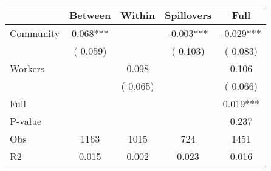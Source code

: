 
\begin{tabular}{l*{4}{c}}\hline&\multicolumn{1}{c}{Between}&\multicolumn{1}{c}{Within}&\multicolumn{1}{c}{Spillovers}&\multicolumn{1}{c}{Full}\\ \hline
 Community             &              0.068***      &                                               &       -0.003*** &        -0.029***                            \\ 
                               &        (       0.059)           &                                       &       (       0.103)     &      (       0.083)                                           \\ 
 Workers       &                                               &        0.098    &                                &             0.106                            \\ 
                               &                                               & (       0.065)                  &                                        &      (       0.066)                                           \\ 
\hline                                                                                                                                                                                                                                            
 Full                  &                                               &                                               &                                        &             0.019***                                     \\ 
 P-value               &                                               &                                               &                                        &             0.237                                           \\ 
 Obs                   &               1163               &       1015                       &       724                &              1451                                               \\ 
 R2                    &                      0.015              &              0.002                      &              0.023               &                     0.016                                              \\ 
\hline \end{tabular}                                                                                                                                                                                                              